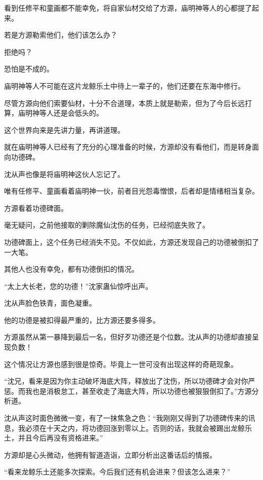 
\begin{this_body}



看到任修平和童画都不能幸免，将自家仙材交给了方源，庙明神等人的心都提了起来。

若是方源勒索他们，他们该怎么办？

拒绝吗？

恐怕是不成的。

庙明神等人不可能在这片龙鲸乐土中待上一辈子的，他们还要在东海中修行。

尽管方源向他们索要仙材，十分不合道理，本质上就是勒索，但为了今后长远打算，庙明神等人还是会低头的。

这个世界向来是先讲力量，再讲道理。

就在庙明神等人已经有了充分的心理准备的时候，方源却没有看他们，而是转身面向功德碑。

沈从声也像是将庙明神这伙人忘记了。

唯有任修平、童画看着庙明神一伙，前者目光怨毒憎恨，后者却是情绪相当复杂。

方源看着功德碑面。

毫无疑问，之前他接取的剿除魔仙沈伤的任务，已经彻底失败了。

功德碑面上，这个任务已经消失不见。不仅如此，方源还发现自己的功德被倒扣了一大笔。

其他人也没有幸免，都有功德倒扣的情况。

“太上大长老，您的功德！”沈家蛊仙惊呼出声。

沈从声脸色铁青，面色凝重。

他的功德是被扣得最严重的，比方源还要多得多。

方源虽然从第一暴降到最后一名，但好歹功德还是个位数。沈从声的功德却直接呈现负数！

这个情况让方源也感到很是惊奇。毕竟上一世可没有出现这样的奇葩现象。

“沈兄，看来是因为你主动破坏海底大阵，释放出了沈伤，所以功德碑才会对你严惩。而我也是消极怠工，甚至收走了海底大阵，所以功德也被狠狠倒扣了。”方源分析道。

沈从声这时面色微微一变，有了一抹焦急之色：“我刚刚又得到了功德碑传来的讯息，我必须在十天之内，将功德回涨到零以上。否则的话，我就会被踢出龙鲸乐土，并且今后再没有资格进来。”

方源却是心头微动，他拥有智道造诣，立即分析出这番话后的情报。

“看来龙鲸乐土还能多次探索。今后我们还有机会进来？但该怎么进来？”


\end{this_body}
